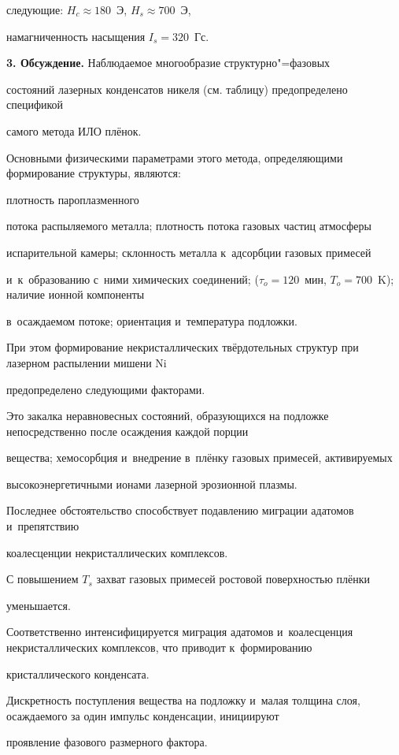 следующие: $H_c \approx  180$~Э, $H_s \approx  700$~Э,

намагниченность насыщения $I_s = 320$~Гс.



\textbf{3. Обсуждение.} Наблюдаемое многообразие структурно"=фазовых

состояний лазерных конденсатов никеля (см. таблицу) предопределено спецификой

самого метода ИЛО плёнок.

Основными физическими параметрами этого метода, определяющими формирование структуры, являются:

плотность пароплазменного

потока распыляемого металла; плотность потока газовых частиц атмосферы

испарительной камеры; склонность металла к~адсорбции газовых примесей

и~к~образованию с~ними химических соединений; ($\tau_o=120$~мин, $T_o=700$~K); наличие ионной компоненты

в~осаждаемом потоке; ориентация и~температура подложки.

При этом формирование некристаллических твёрдотельных структур при лазерном распылении мишени Ni

предопределено следующими факторами.

Это закалка неравновесных состояний, образующихся на подложке непосредственно после осаждения каждой порции

вещества; хемосорбция и~внедрение в~плёнку газовых примесей, активируемых

высокоэнергетичными ионами лазерной эрозионной плазмы.

Последнее обстоятельство способствует подавлению миграции адатомов и~препятствию

коалесценции некристаллических \mbox{комплексов.}



С повышением $T_{s}$ захват газовых примесей ростовой поверхностью плёнки

уменьшается.

Соответственно интенсифицируется миграция адатомов и~коалесценция некристаллических комплексов, что приводит к~формированию

кристаллического конденсата.

Дискретность поступления вещества на подложку и~малая толщина слоя, осаждаемого за один импульс конденсации, инициируют

проявление фазового размерного фактора.

